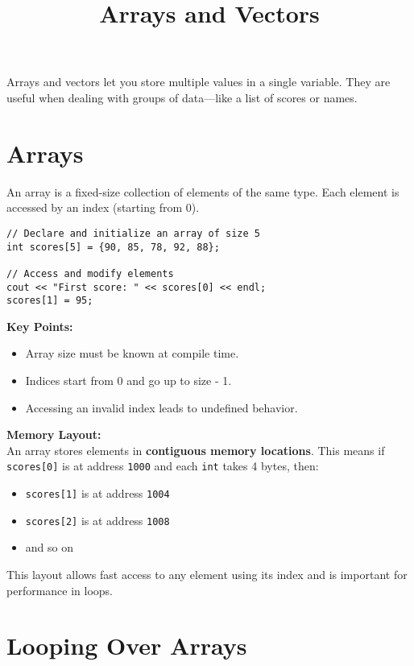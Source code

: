 \documentclass{article}
\title{Arrays and Vectors}
\author{}
\date{}
\begin{document}
\maketitle


Arrays and vectors let you store multiple values in a single variable. They are useful when dealing with groups of data—like a list of scores or names.

\section{Arrays}

An array is a fixed-size collection of elements of the same type. Each element is accessed by an index (starting from 0).

\begin{lstlisting}[style=cppstyle]
// Declare and initialize an array of size 5
int scores[5] = {90, 85, 78, 92, 88};

// Access and modify elements
cout << "First score: " << scores[0] << endl;
scores[1] = 95;
\end{lstlisting}

\textbf{Key Points:}
\begin{itemize}
    \item Array size must be known at compile time.
    \item Indices start from 0 and go up to size - 1.
    \item Accessing an invalid index leads to undefined behavior.
\end{itemize}

\textbf{Memory Layout:} \\
An array stores elements in \textbf{contiguous memory locations}. This means if \texttt{scores[0]} is at address \texttt{1000} and each \texttt{int} takes 4 bytes, then:

\begin{itemize}
    \item \texttt{scores[1]} is at address \texttt{1004}
    \item \texttt{scores[2]} is at address \texttt{1008}
    \item and so on
\end{itemize}

This layout allows fast access to any element using its index and is important for performance in loops.


\section{Looping Over Arrays}
\end{document}
